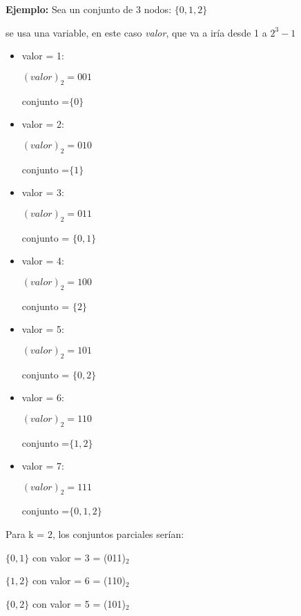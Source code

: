 \quad


\textbf{Ejemplo:} Sea un conjunto de 3 nodos: $ \lbrace 0 , 1 , 2 \rbrace $

\quad se usa una variable, en este caso \textit{valor}, que va a ir\'ia desde 1 a $ 2^3 - 1$

\begin{itemize}
\item valor = 1:

\quad \quad $(valor)_{2} = 001$

\quad \quad conjunto =$ \lbrace 0 \rbrace $

\item valor = 2:

\quad \quad $(valor)_{2} = 010$

\quad \quad conjunto =$ \lbrace 1 \rbrace $

\item valor = 3:

\quad \quad $(valor)_{2} = 011$

\quad \quad conjunto = $\lbrace 0 , 1 \rbrace$ 

\item valor = 4:

\quad \quad $(valor)_{2} = 100$

\quad \quad conjunto = $\lbrace 2 \rbrace $

\item valor = 5:

\quad \quad $(valor)_{2} = 101$

\quad \quad conjunto = $\lbrace 0 , 2 \rbrace $

\item valor = 6:

\quad \quad $(valor)_{2} = 110$

\quad \quad conjunto =$ \lbrace 1 , 2 \rbrace $

\item valor = 7:

\quad \quad $(valor)_{2} = 111$

\quad \quad conjunto =$ \lbrace 0 , 1 , 2 \rbrace $

\end{itemize}

\quad Para k = 2, los conjuntos parciales ser\'ian:

\quad \quad \quad $\lbrace 0 , 1 \rbrace $ con valor = 3 = (011)$_2$

\quad \quad \quad $\lbrace 1 , 2 \rbrace $ con valor = 6 = (110)$_2$

\quad \quad \quad $\lbrace 0 , 2 \rbrace $ con valor = 5 = (101)$_2$


